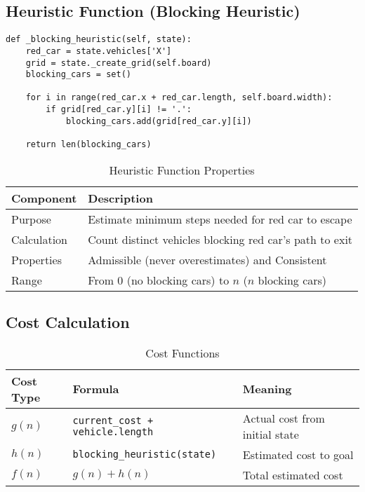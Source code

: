 \documentclass[12pt,a4paper]{article}
\begin{document}
\subsection{Heuristic Function (Blocking Heuristic)}

\begin{lstlisting}[caption=Blocking Heuristic Implementation]
def _blocking_heuristic(self, state):
    red_car = state.vehicles['X']
    grid = state._create_grid(self.board)
    blocking_cars = set()
    
    for i in range(red_car.x + red_car.length, self.board.width):
        if grid[red_car.y][i] != '.':
            blocking_cars.add(grid[red_car.y][i])
    
    return len(blocking_cars)
\end{lstlisting}

\begin{table}[h!]
\centering
\begin{tabular}{|l|p{8cm}|}
\hline
\textbf{Component} & \textbf{Description} \\
\hline
Purpose & Estimate minimum steps needed for red car to escape \\
\hline
Calculation & Count distinct vehicles blocking red car's path to exit \\
\hline
Properties & Admissible (never overestimates) and Consistent \\
\hline
Range & From 0 (no blocking cars) to $n$ ($n$ blocking cars) \\
\hline
\end{tabular}
\caption{Heuristic Function Properties}
\end{table}

\subsection{Cost Calculation}

\begin{table}[h!]
\centering
\begin{tabular}{|l|l|p{5cm}|}
\hline
\textbf{Cost Type} & \textbf{Formula} & \textbf{Meaning} \\
\hline
$g(n)$ & \texttt{current\_cost + vehicle.length} & Actual cost from initial state \\
\hline
$h(n)$ & \texttt{blocking\_heuristic(state)} & Estimated cost to goal \\
\hline
$f(n)$ & $g(n) + h(n)$ & Total estimated cost \\
\hline
\end{tabular}
\caption{Cost Functions}
\end{table}
\end{document}
